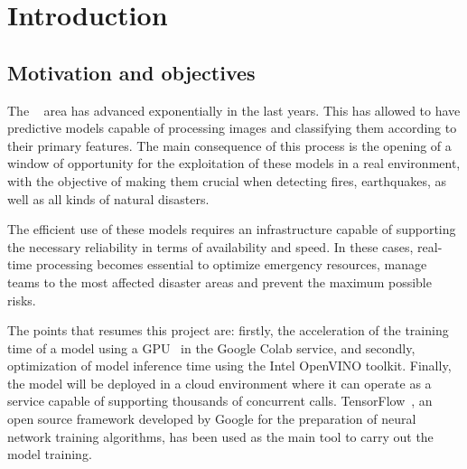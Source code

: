 \cleardoublepage
\chapter{Introduction}
\label{ch:chapter1}


\section{Motivation and objectives}\label{sec:motivación-y-objetivos}

The ~\cite{deep_learning} area has advanced exponentially in the last years.
This has allowed to have predictive models capable of processing images and classifying them according to their primary features.
The main consequence of this process is the opening of a window of opportunity for the exploitation of these models in a real environment, with the objective of making them crucial when detecting fires, earthquakes, as well as all kinds of natural disasters.

The efficient use of these models requires an infrastructure capable of supporting the necessary reliability in terms of availability and speed.
In these cases, real-time processing becomes essential to optimize emergency resources, manage teams to the most affected disaster areas and prevent the maximum possible risks.


The points that resumes this project are: firstly, the acceleration of the training time of a  model using a GPU~\cite{gpu_solution}
in the Google Colab service, and secondly, optimization of model inference time using the Intel OpenVINO toolkit. Finally, the model will be deployed in a cloud environment where it can operate as a service capable of supporting thousands of concurrent calls.
TensorFlow~\cite{deep_learning_tensorflow}, an open source framework developed by Google for the preparation of neural network training algorithms, has been used as the main tool to carry out the model training.

